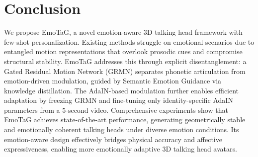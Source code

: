 \section{Conclusion}
We propose EmoTaG, a novel emotion-aware 3D talking head framework with few-shot personalization. Existing methods struggle on emotional scenarios due to entangled motion representations that overlook prosodic cues and compromise structural stability. EmoTaG addresses this through explicit disentanglement: a Gated Residual Motion Network (GRMN) separates phonetic articulation from emotion-driven modulation, guided by Semantic Emotion Guidance via knowledge distillation. The AdaIN-based modulation further enables efficient adaptation by freezing GRMN and fine-tuning only identity-specific AdaIN parameters from a 5-second video. Comprehensive experiments show that EmoTaG achieves state-of-the-art performance, generating geometrically stable and emotionally coherent talking heads under diverse emotion conditions. Its emotion-aware design effectively bridges physical accuracy and affective expressiveness, enabling more emotionally adaptive 3D talking head avatars.
